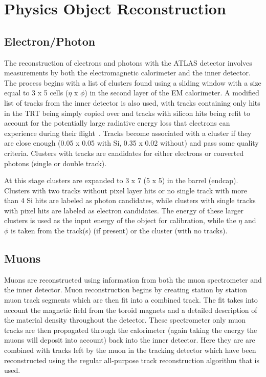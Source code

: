 \chapter{Physics Object Reconstruction}
\label{Reco}

\section{Electron/Photon}
\label{EMReco}
The reconstruction of electrons and photons with the ATLAS detector involves measurements by both the electromagnetic calorimeter and the inner detector.  
The process begins with a list of clusters found using a sliding window with a size equal to 3 x 5 cells ($\eta$ x $\phi$) in the second layer of the EM calorimeter.  
A modified list of tracks from the inner detector is also used, with tracks containing only hits in the TRT being simply copied over and tracks with silicon hits being refit to account for the potentially large radiative energy loss that electrons can experience during their flight~\cite{ATLAS-CONF-2012-047}.  
Tracks become associated with a cluster if they are close enough (0.05 x 0.05 with Si, 0.35 x 0.02 without) and pass some quality criteria.  
Clusters with tracks are candidates for either electrons or converted photons (single or double track).  

At this stage clusters are expanded to 3 x 7 (5 x 5) in the barrel (endcap).  
Clusters with two tracks without pixel layer hits or no single track with more than 4 Si hits are labeled as photon candidates, while clusters with single tracks with pixel hits are labeled as electron candidates.  
The energy of these larger clusters is used as the input energy of the object for calibration, while the $\eta$ and $\phi$ is taken from the track(s) (if present) or the cluster (with no tracks).  

\section{Muons}
\label{Muons}

Muons are reconstructed using information from both the muon spectrometer and the inner detector.  
Muon reconstruction begins by creating station by station muon track segments which are then fit into a combined track.  
The fit takes into account the magnetic field from the toroid magnets and a detailed description of the material density throughout the detector.  
These spectrometer only muon tracks are then propagated through the calorimeter (again taking the energy the muons will deposit into account) back into the inner detector.  
Here they are are combined with tracks left by the muon in the tracking detector which have been reconstructed using the regular all-purpose track reconstruction algorithm that is used.  

